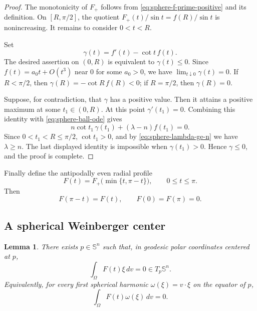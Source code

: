 \documentclass[11pt]{amsart}
\newtheorem{lemma}[theorem]{Lemma}
\theoremstyle{remark}
\newcommand{\Sn}{\mathbb S}
\begin{document}
\begin{proof}
The monotonicity of $F_+$ follows from \eqref{eq:sphere-f-prime-positive} and its definition.  On $[R,\pi/2]$, the quotient $F_+(t)/\sin t=f(R)/\sin t$ is nonincreasing.  It remains to consider $0<t<R$.

Set
$$
        \gamma(t)=f'(t)-\cot t\,f(t).
$$
The desired assertion on $(0,R)$ is equivalent to $\gamma(t)\le0$.  Since $f(t)=a_0t+O(t^3)$ near $0$ for some $a_0>0$, we have $\lim_{t\downarrow0}\gamma(t)=0$.  If $R<\pi/2$, then $\gamma(R)=-\cot R\,f(R)<0$; if $R=\pi/2$, then $\gamma(R)=0$.

Suppose, for contradiction, that $\gamma$ has a positive value.  Then it attains a positive maximum at some $t_1\in(0,R)$.  At this point $\gamma'(t_1)=0$.  Combining this identity with \eqref{eq:sphere-ball-ode} gives
$$
        n\cot t_1\,\gamma(t_1)+(\lambda-n)f(t_1)=0.
$$
Since $0<t_1<R\le\pi/2$, $\cot t_1>0$, and by \eqref{eq:sphere-lambda-ge-n} we have $\lambda\ge n$.  The last displayed identity is impossible when $\gamma(t_1)>0$.  Hence $\gamma\le0$, and the proof is complete.
\end{proof}

Finally define the antipodally even radial profile
\begin{equation}\label{eq:sphere-F-even-def}
        F(t)=F_+\bigl(\min\{t,\pi-t\}\bigr),
        \qquad 0\le t\le\pi.
\end{equation}
Then
\begin{equation}\label{eq:sphere-F-even}
        F(\pi-t)=F(t),
        \qquad
        F(0)=F(\pi)=0.
\end{equation}

\subsection{A spherical Weinberger center}

\begin{lemma}\label{lem:sphere-center}
There exists $p\in\Sn^n$ such that, in geodesic polar coordinates centered at $p$,
\begin{equation}\label{eq:sphere-center}
        \int_\Omega F(t)\xi\,dv=0\in T_p\Sn^n.
\end{equation}
Equivalently, for every first spherical harmonic $\omega(\xi)=v\cdot\xi$ on the equator of $p$,
$$
        \int_\Omega F(t)\omega(\xi)\,dv=0.
$$
\end{lemma}
\end{document}
